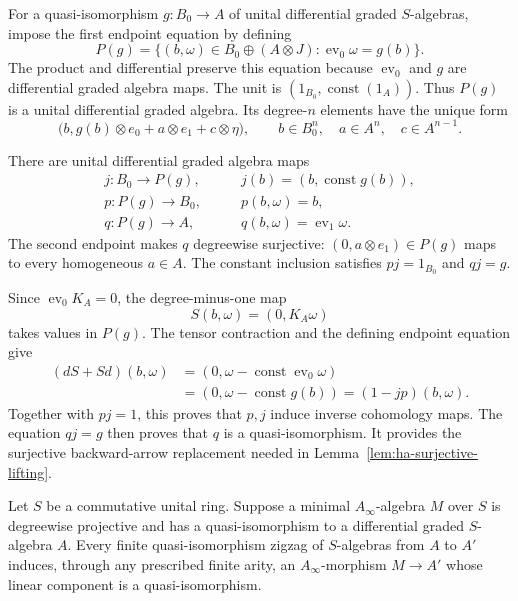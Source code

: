 For a quasi-isomorphism $g:B_0\to A$ of unital differential graded
$S$-algebras, impose the first
endpoint equation by defining
\[
 P(g)=
 \{(b,\omega)\in B_0\oplus(A\otimes J):
                    \operatorname{ev}_0\omega=g(b)\}.
\]
The product and differential preserve this equation because
$\operatorname{ev}_0$ and $g$ are differential graded algebra maps.
The unit is $(1_{B_0},\operatorname{const}(1_A))$.
Thus $P(g)$ is a unital differential graded algebra.
Its degree-$n$ elements have the unique form
\[
 \bigl(b,g(b)\otimes e_0+a\otimes e_1+c\otimes\eta\bigr),
 \qquad b\in B_0^n,\quad a\in A^n,\quad c\in A^{n-1}.
\]

There are unital differential graded algebra maps
\[
 \begin{split}
 j:B_0\longrightarrow P(g),&\qquad
 j(b)=(b,\operatorname{const}g(b)),\\
 p:P(g)\longrightarrow B_0,&\qquad p(b,\omega)=b,\\
 q:P(g)\longrightarrow A,&\qquad
 q(b,\omega)=\operatorname{ev}_1\omega.
 \end{split}
\]
The second endpoint makes $q$ degreewise surjective:
$(0,a\otimes e_1)\in P(g)$ maps to every homogeneous $a\in A$.
The constant inclusion satisfies $pj=1_{B_0}$ and $qj=g$.

Since $\operatorname{ev}_0K_A=0$, the degree-minus-one map
\[
 S(b,\omega)=(0,K_A\omega)
\]
takes values in $P(g)$.
The tensor contraction and the defining endpoint equation give
\[
 \begin{split}
 (dS+Sd)(b,\omega)
 &=(0,\omega-\operatorname{const}\operatorname{ev}_0\omega)\\
 &=(0,\omega-\operatorname{const}g(b))
 =(1-jp)(b,\omega).
 \end{split}
\]
Together with $pj=1$, this proves that $p,j$ induce inverse cohomology maps.
The equation $qj=g$ then proves that $q$ is a quasi-isomorphism.
It provides the surjective backward-arrow replacement needed in
Lemma~\ref{lem:ha-surjective-lifting}.

\begin{proposition}\label{prop:ha-zigzag-transport}
Let $S$ be a commutative unital ring.
Suppose a minimal $A_\infty$-algebra $M$ over $S$ is degreewise
projective and has a quasi-isomorphism to a differential graded
$S$-algebra $A$.
Every finite quasi-isomorphism zigzag of $S$-algebras from $A$ to
$A'$ induces, through any prescribed finite arity, an
$A_\infty$-morphism $M\to A'$ whose linear component is a
quasi-isomorphism.
\end{proposition}

